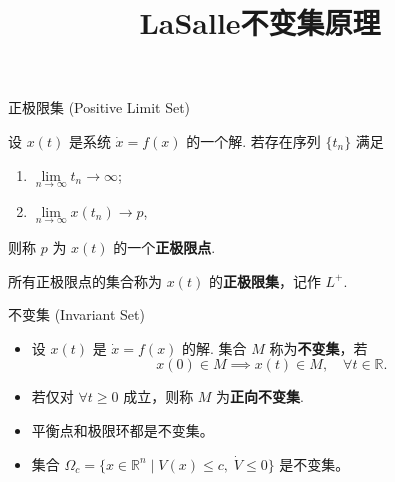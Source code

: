 \documentclass{beamer}
\title[LaSalle不变集原理]{LaSalle不变集原理}
\date{}
\begin{document}
	
	
	\begin{frame}{正极限集 (Positive Limit Set)}
		\begin{definition}
			设 \(x(t)\) 是系统 \(\dot{x}=f(x)\) 的一个解. 若存在序列 \(\{t_n\}\) 满足
		\begin{enumerate}
			\item \(\lim\limits_{n\to\infty} t_n \to \infty\);
			\item \(\lim\limits_{n\to\infty} x(t_n) \to p\),
		\end{enumerate}
		则称 \(p\) 为 \(x(t)\) 的一个\textbf{正极限点}.
		
		所有正极限点的集合称为 \(x(t)\) 的\textbf{正极限集}，记作 \(L^+\).
		\end{definition}
	\end{frame}
	
	\begin{frame}{不变集 (Invariant Set)}
		\begin{definition}
			\begin{itemize}
			\item 设 \(x(t)\) 是 \(\dot{x}=f(x)\) 的解. 集合 \(M\) 称为\textbf{不变集}，若
			\[
			x(0)\in M \implies x(t)\in M,\quad \forall t\in\mathbb{R}.		
			\]
			\item 若仅对 \(\forall t\ge 0\) 成立，则称 \(M\) 为\textbf{正向不变集}.
		\end{itemize}
		\end{definition}
		\begin{example}
			\begin{itemize}
				\item 平衡点和极限环都是不变集。
				\item 集合 \(\Omega_c=\{x\in\mathbb{R}^n \mid V(x)\le c,\; \dot V\le 0\}\) 是不变集。
			\end{itemize}
		\end{example}
	\end{frame}
	
\end{document}

